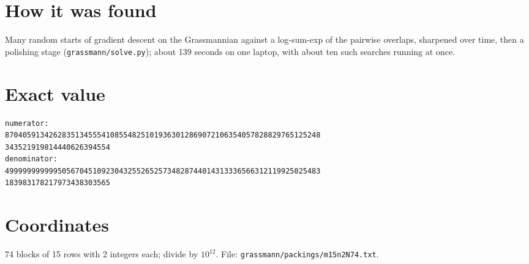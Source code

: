 \documentclass[11pt,a4paper]{article}
\begin{document}
\section{How it was found}
Many random starts of gradient descent on the Grassmannian against a log-sum-exp of the pairwise overlaps, sharpened over time, then a polishing stage (\texttt{grassmann/solve.py}); about 139 seconds on one laptop, with about ten such searches running at once.


\appendix
\section{Exact value}
{\small
\begin{verbatim}
numerator:
870405913426283513455541085548251019363012869072106354057828829765125248
343521919814440626394554
denominator:
499999999999505670451092304325526525734828744014313336566312119925025483
183983178217973438303565
\end{verbatim}}

\section{Coordinates}
74 blocks of 15 rows with 2 integers each; divide by $10^{12}$. File: \texttt{grassmann/packings/m15n2N74.txt}.
{\tiny
\begin{multicols}{4}
\end{multicols}}
\end{document}
